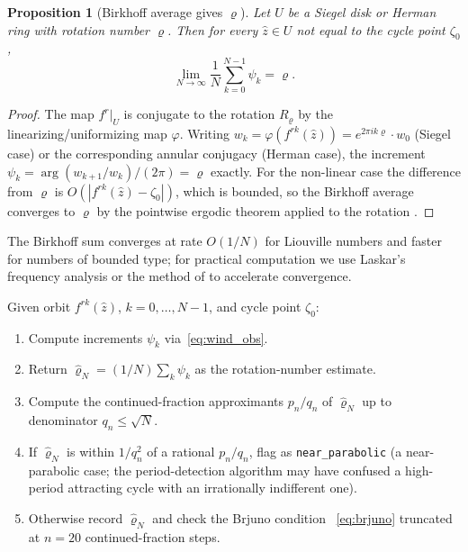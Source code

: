 \documentclass[12pt,a4paper]{article}
\newtheorem{proposition}[theorem]{Proposition}
\newcommand{\rot}{\varrho}    %
\begin{document}
\begin{proposition}[Birkhoff average gives $\rot$]
\label{prop:rot_birkhoff}
  Let $U$ be a Siegel disk or Herman ring with rotation number $\rot$.
  Then for every $\hat{z}\in U$ not equal to the cycle point $\zeta_0$,
  \begin{equation}\label{eq:rot_limit}
    \lim_{N\to\infty} \frac{1}{N}\sum_{k=0}^{N-1}\psi_k = \rot.
  \end{equation}
\end{proposition}

\begin{proof}
  The map $f^r|_U$ is conjugate to the rotation $R_\rot$ by the
  linearizing/uniformizing map $\varphi$.
  Writing $w_k = \varphi(f^{rk}(\hat{z})) = e^{2\pi i k\rot}\cdot w_0$
  (Siegel case) or the corresponding annular conjugacy (Herman case),
  the increment $\psi_k = \arg(w_{k+1}/w_k)/(2\pi) = \rot$ exactly.
  For the non-linear case the difference from $\rot$ is
  $O(|f^{rk}(\hat{z}) - \zeta_0|)$, which is bounded, so the
  Birkhoff average converges to $\rot$ by the pointwise ergodic theorem
  applied to the rotation \cite{Birkhoff1931}.
\end{proof}

The Birkhoff sum converges at rate $O(1/N)$ for Liouville numbers and
faster for numbers of bounded type; for practical computation we use
Laskar's frequency analysis \cite{Laskar1993} or the method of
\cite{LuqueVillanueva2014} to accelerate convergence.

\begin{algorithm}
  \caption{Rotation number estimate}
  \label{alg:rot}
  Given orbit $f^{rk}(\hat{z})$, $k = 0,\ldots, N-1$, and cycle point
  $\zeta_0$:
  \begin{enumerate}
    \item Compute increments $\psi_k$ via~\eqref{eq:wind_obs}.
    \item Return $\hat\rot_N = (1/N)\sum_{k}\psi_k$ as the rotation-number
          estimate.
    \item Compute the continued-fraction approximants $p_n/q_n$ of
          $\hat\rot_N$ up to denominator $q_n \le \sqrt{N}$.
    \item If $\hat\rot_N$ is within $1/q_n^2$ of a rational $p_n/q_n$,
          flag as \texttt{near\_parabolic} (a near-parabolic case; the
          period-detection algorithm may have confused a high-period
          attracting cycle with an irrationally indifferent one).
    \item Otherwise record $\hat\rot_N$ and check the Brjuno condition~%
          \eqref{eq:brjuno} truncated at $n = 20$ continued-fraction
          steps.
  \end{enumerate}
\end{algorithm}
\end{document}
